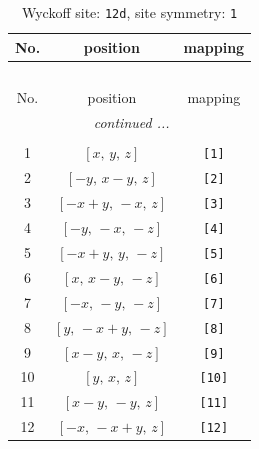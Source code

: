 \documentclass[fleqn,8pt]{jsarticle}
\begin{document}
\renewcommand{\arraystretch}{1.2}
\begin{longtable}{ccc}
\caption{Wyckoff site: {\tt 12d}, site symmetry: {\tt 1}}
 \\
 \hline \hline
No. & position & mapping \\ \hline \endfirsthead

\multicolumn{2}{l}{\tablename\ \thetable{}} \\
 \hline \hline
No. & position & mapping \\ \hline \endhead

 \hline \hline
\multicolumn{2}{r}{\footnotesize\it continued ...} \\ \endfoot

 \hline \hline
\multicolumn{2}{r}{} \\ \endlastfoot

1 & $\left[ x,\, y,\, z \right]$ & {\tt [1]} \\ \hline
2 & $\left[ - y,\, x - y,\, z \right]$ & {\tt [2]} \\ \hline
3 & $\left[ - x + y,\, - x,\, z \right]$ & {\tt [3]} \\ \hline
4 & $\left[ - y,\, - x,\, - z \right]$ & {\tt [4]} \\ \hline
5 & $\left[ - x + y,\, y,\, - z \right]$ & {\tt [5]} \\ \hline
6 & $\left[ x,\, x - y,\, - z \right]$ & {\tt [6]} \\ \hline
7 & $\left[ - x,\, - y,\, - z \right]$ & {\tt [7]} \\ \hline
8 & $\left[ y,\, - x + y,\, - z \right]$ & {\tt [8]} \\ \hline
9 & $\left[ x - y,\, x,\, - z \right]$ & {\tt [9]} \\ \hline
10 & $\left[ y,\, x,\, z \right]$ & {\tt [10]} \\ \hline
11 & $\left[ x - y,\, - y,\, z \right]$ & {\tt [11]} \\ \hline
12 & $\left[ - x,\, - x + y,\, z \right]$ & {\tt [12]} \\
\end{longtable}
\end{document}
